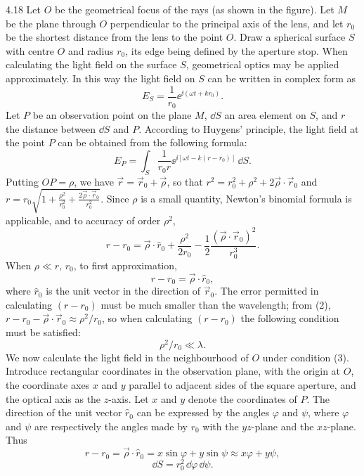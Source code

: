 \begin{solution}{4.18}
Let $O$ be the geometrical focus of the rays (as shown in the figure). Let $M$ be the plane
through $O$ perpendicular to the principal axis of the lens, and let $r_0$ be the shortest
distance from the lens to the point $O$. Draw a spherical surface $S$ with centre $O$ and radius
$r_0$, its edge being defined by the aperture stop. When calculating the light field on the
surface $S$, geometrical optics may be applied approximately. In this way the light field on $S$
can be written in complex form as
\begin{equation*}
E_S = \frac{1}{r_0}\ee^{\ii(\omega t+k r_0)} .
\end{equation*}
Let $P$ be an observation point on the plane $M$, $\dd S$ an area element on $S$, and $r$ the
distance between $\dd S$ and $P$. According to Huygens' principle, the light field at the point
$P$ can be obtained from the following formula:
\begin{equation}
E_P = \int_S \frac{1}{r_0r}\ee^{\ii[\omega t-k(r-r_0)]}\,\dd S . \tag{1}
\end{equation}
Putting $OP=\rho$, we have $\vec{r}=\vec{r}_0+\vec{\rho}$, so that
$r^2 = r_0^2+\rho^2+2\vec{\rho}\cdot\vec{r}_0$ and
$r = r_0\sqrt{1+\frac{\rho^2}{r_0^2}+\frac{2\vec{\rho}\cdot\vec{r}_0}{r_0^2}}$. Since $\rho$ is
a small quantity, Newton's binomial formula is applicable, and to accuracy of order $\rho^2$,
\begin{equation}
r-r_0 = \vec{\rho}\cdot\hat{r}_0 + \frac{\rho^2}{2r_0}
       - \frac{1}{2}\frac{(\vec{\rho}\cdot\vec{r}_0)^2}{r_0^3} . \tag{2}
\end{equation}
When $\rho \ll r,\,r_0$, to first approximation,
\begin{equation*}
r-r_0 = \vec{\rho}\cdot\hat{r}_0 ,
\end{equation*}
where $\hat{r}_0$ is the unit vector in the direction of $\vec{r}_0$. The error permitted in
calculating $(r-r_0)$ must be much smaller than the wavelength; from (2),
$r-r_0-\vec{\rho}\cdot\vec{r}_0\approx \rho^2/r_0$, so when calculating $(r-r_0)$ the following
condition must be satisfied:
\begin{equation}
\rho^2/r_0 \ll \lambda . \tag{3}
\end{equation}
We now calculate the light field in the neighbourhood of $O$ under condition (3). Introduce
rectangular coordinates in the observation plane, with the origin at $O$, the coordinate axes
$x$ and $y$ parallel to adjacent sides of the square aperture, and the optical axis as the
$z$-axis. Let $x$ and $y$ denote the coordinates of $P$. The direction of the unit vector
$\hat{r}_0$ can be expressed by the angles $\varphi$ and $\psi$, where $\varphi$ and $\psi$ are
respectively the angles made by $r_0$ with the $yz$-plane and the $xz$-plane. Thus
\begin{equation*}
r-r_0 = \vec{\rho}\cdot\hat{r}_0 = x\sin\varphi + y\sin\psi \approx x\varphi + y\psi ,
\end{equation*}
\begin{equation*}
\dd S = r_0^2\,\dd\varphi\,\dd\psi .
\end{equation*}


\end{solution}
